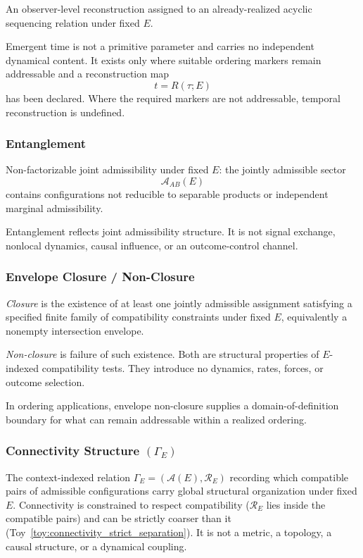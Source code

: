 \documentclass[aps,prx,onecolumn,11pt]{revtex4-2}
\theoremstyle{plain}
\theoremstyle{definition}
\theoremstyle{remark}
\begin{document}
An observer-level reconstruction assigned to an already-realized
acyclic sequencing relation under fixed \(E\).

Emergent time is not a primitive parameter and carries no independent
dynamical content. It exists only where suitable ordering markers remain
addressable and a reconstruction map
\[
t=R(\tau;E)
\]
has been declared. Where the required markers are not addressable,
temporal reconstruction is undefined.

\subsubsection*{Entanglement}

Non-factorizable joint admissibility under fixed \(E\): the jointly
admissible sector
\[
\mathcal A_{AB}(E)
\]
contains configurations not reducible to separable products or
independent marginal admissibility.

Entanglement reflects joint admissibility structure. It is not signal
exchange, nonlocal dynamics, causal influence, or an outcome-control
channel.

\subsubsection*{Envelope Closure / Non-Closure}
\label{gloss:envelope_closure_nonclosure}

\emph{Closure} is the existence of at least one jointly admissible
assignment satisfying a specified finite family of compatibility
constraints under fixed \(E\), equivalently a nonempty intersection
envelope.

\emph{Non-closure} is failure of such existence. Both are structural
properties of \(E\)-indexed compatibility tests. They introduce no
dynamics, rates, forces, or outcome selection.

In ordering applications, envelope non-closure supplies a
domain-of-definition boundary for what can remain addressable within a
realized ordering.

\subsubsection*{Connectivity Structure \((\Gamma_E)\)}
\label{gloss:connectivity}

The context-indexed relation \(\Gamma_E=(\mathcal A(E),\mathcal R_E)\)
recording which compatible pairs of admissible configurations carry
global structural organization under fixed \(E\). Connectivity is
constrained to respect compatibility
(\(\mathcal R_E\) lies inside the compatible pairs) and can be
strictly coarser than it
(Toy~\ref{toy:connectivity_strict_separation}). It is not a metric, a
topology, a causal structure, or a dynamical coupling.
\end{document}
